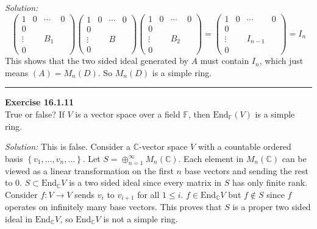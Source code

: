 \documentclass[a4paper, 12pt]{article}
\newenvironment{problem}[2][Exercise]
    { \begin{mdframed}[backgroundcolor=gray!20] \textbf{#1 #2} \\}
    {  \end{mdframed}}
\newenvironment{solution}
    {\textit{Solution:}}
    {}
\newcommand{\End}{\text{End}}
\begin{document}
\begin{solution}
\[\begin{pmatrix}
    1 & 0 &\cdots & 0\\ 
    0 &   &       &   \\ 
    \vdots & & B_1 &  \\ 
    0 & & &
\end{pmatrix}\begin{pmatrix}
    1 & 0 &\cdots & 0\\ 
    0 &   &       &   \\ 
    \vdots & & B &  \\ 
    0 & & &
\end{pmatrix}\begin{pmatrix}
    1 & 0 &\cdots & 0\\ 
    0 &   &       &   \\ 
    \vdots & & B_2 &  \\ 
    0 & & &
\end{pmatrix}=\begin{pmatrix}
    1 & 0 &\cdots & 0\\ 
    0 &   &       &   \\ 
    \vdots & & I_{n-1} &  \\ 
    0 & & &
\end{pmatrix}=I_n\]
This shows that the two sided ideal generated by \(A\) must contain \(I_n\), which just means \((A)=M_n(D)\). So \(M_n(D)\) is a simple ring.  
\end{solution}

\noindent\rule{7in}{2.8pt}
\begin{problem}{16.1.11}
True or false? If \(V\) is a vector space over a field \(\mathbb{F}\), then \(\End_{\mathbb{F}}(V)\) is a simple ring.
\end{problem}
\begin{solution}
This is false. Consider a \(\mathbb{C}\)-vector space \(V\) with a countable ordered basis \(\left\{ v_1,\ldots,v_n,\ldots \right\}\). Let \(S=\oplus_{n=1}^{\infty} M_n(\mathbb{C})\). Each element in 
\(M_n(\mathbb{C})\) can be viewed as a linear transformation on the first \(n\) base vectors and sending the rest to \(0\). \(S\subset \End_{\mathbb{C}}V\) is a two sided ideal since every matrix in \(S\) has only finite rank. Consider \(f:V\rightarrow V\) sends 
\(v_i\) to \(v_{i+1}\) for all \(1\leq i\). \(f\in \End_{\mathbb{C}}V\) but \(f\notin S\) since \(f\) operates on infinitely many base vectors. This proves that \(S\) is a proper two sided ideal in \(\End_{\mathbb{C}}V\), so \(\End_{\mathbb{C}}V\) is not a 
simple ring. 
\end{solution}
\end{document}
